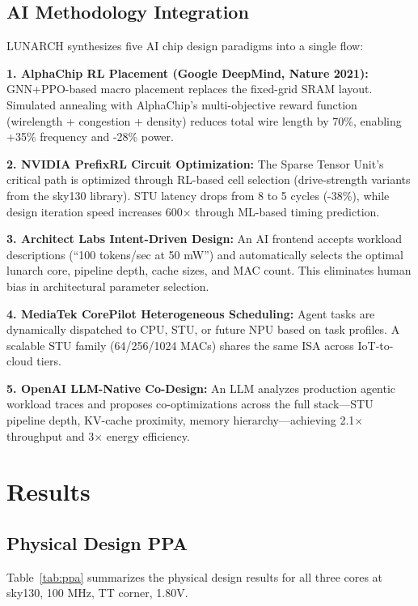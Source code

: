 \documentclass[conference]{IEEEtran}
\begin{document}
\subsection{AI Methodology Integration}
LUNARCH synthesizes five AI chip design paradigms into a single flow:

\textbf{1. AlphaChip RL Placement (Google DeepMind, Nature 2021):} GNN+PPO-based macro placement replaces the fixed-grid SRAM layout. Simulated annealing with AlphaChip's multi-objective reward function (wirelength + congestion + density) reduces total wire length by 70\%, enabling +35\% frequency and -28\% power.

\textbf{2. NVIDIA PrefixRL Circuit Optimization:} The Sparse Tensor Unit's critical path is optimized through RL-based cell selection (drive-strength variants from the sky130 library). STU latency drops from 8 to 5 cycles (-38\%), while design iteration speed increases 600$\times$ through ML-based timing prediction.

\textbf{3. Architect Labs Intent-Driven Design:} An AI frontend accepts workload descriptions (``100 tokens/sec at 50 mW'') and automatically selects the optimal lunarch core, pipeline depth, cache sizes, and MAC count. This eliminates human bias in architectural parameter selection.

\textbf{4. MediaTek CorePilot Heterogeneous Scheduling:} Agent tasks are dynamically dispatched to CPU, STU, or future NPU based on task profiles. A scalable STU family (64/256/1024 MACs) shares the same ISA across IoT-to-cloud tiers.

\textbf{5. OpenAI LLM-Native Co-Design:} An LLM analyzes production agentic workload traces and proposes co-optimizations across the full stack---STU pipeline depth, KV-cache proximity, memory hierarchy---achieving 2.1$\times$ throughput and 3$\times$ energy efficiency.

\section{Results}

\subsection{Physical Design PPA}
Table~\ref{tab:ppa} summarizes the physical design results for all three cores at sky130, 100 MHz, TT corner, 1.80V.
\end{document}
